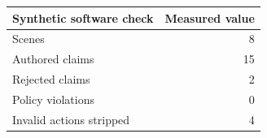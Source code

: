 \begin{tabular}{lr}
\hline
Synthetic software check & Measured value \\
\hline
Scenes & 8 \\
Authored claims & 15 \\
Rejected claims & 2 \\
Policy violations & 0 \\
Invalid actions stripped & 4 \\
\hline
\end{tabular}
